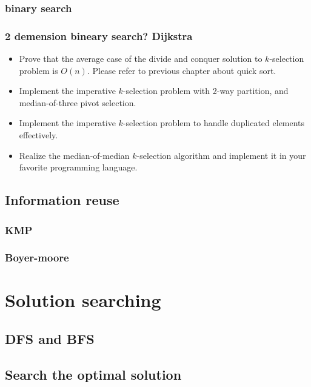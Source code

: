 \documentclass{article}
\begin{document}
\subsubsection{binary search}

\subsubsection{2 demension bineary search? Dijkstra}

\begin{Exercise}
\begin{itemize}
\item Prove that the average case of the divide and conquer solution to $k$-selection problem is $O(n)$. Please refer to previous chapter about quick sort.
\item Implement the imperative $k$-selection problem with 2-way partition, and median-of-three pivot selection.
\item Implement the imperative $k$-selection problem to handle duplicated elements effectively.
\item Realize the median-of-median $k$-selection algorithm and implement it in your favorite programming language.
\end{itemize}
\end{Exercise}

\subsection{Information reuse}

\subsubsection{KMP}

\subsubsection{Boyer-moore}

\section{Solution searching}
\subsection{DFS and BFS}

\subsection{Search the optimal solution}
\end{document}
